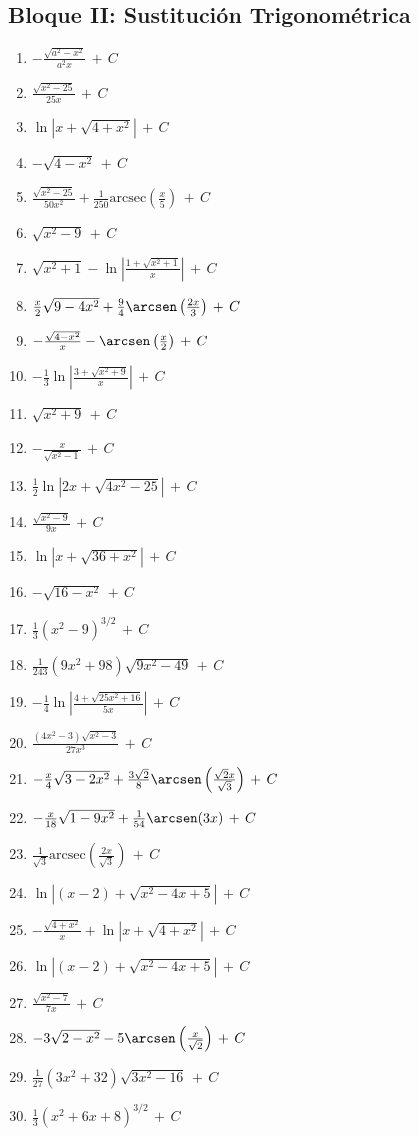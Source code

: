 \documentclass[12pt, letterpaper]{article}
\newcommand{\CC}{\,+\,C}
\begin{document}
\subsection*{Bloque II: Sustitución Trigonométrica}
\begin{enumerate}[leftmargin=*, label=\textbf{\arabic*.}, resume]
  \item $-\frac{\sqrt{a^2-x^2}}{a^2 x} \CC$
  \item $\frac{\sqrt{x^2-25}}{25x} \CC$
  \item $\ln|x + \sqrt{4+x^2}| \CC$
  \item $-\sqrt{4-x^2} \CC$
  \item $\frac{\sqrt{x^2-25}}{50 x^2} + \frac{1}{250}\text{arcsec}\left(\frac{x}{5}\right) \CC$
  \item $\sqrt{x^2-9} \CC$
  \item $\sqrt{x^2+1} - \ln\left|\frac{1+\sqrt{x^2+1}}{x}\right| \CC$
  \item $\frac{x}{2}\sqrt{9-4x^2} + \frac{9}{4}\arcsen\left(\frac{2x}{3}\right) \CC$
  \item $-\frac{\sqrt{4-x^2}}{x} - \arcsen\left(\frac{x}{2}\right) \CC$
  \item $-\frac{1}{3}\ln\left|\frac{3+\sqrt{x^2+9}}{x}\right| \CC$
  \item $\sqrt{x^2+9} \CC$
  \item $-\frac{x}{\sqrt{x^2-1}} \CC$
  \item $\frac{1}{2}\ln|2x + \sqrt{4x^2-25}| \CC$
  \item $\frac{\sqrt{x^2-9}}{9x} \CC$
  \item $\ln|x + \sqrt{36+x^2}| \CC$
  \item $-\sqrt{16-x^2} \CC$
  \item $\frac{1}{3}(x^2-9)^{3/2} \CC$
  \item $\frac{1}{243}(9x^2+98)\sqrt{9x^2-49} \CC$
  \item $-\frac{1}{4}\ln\left|\frac{4+\sqrt{25x^2+16}}{5x}\right| \CC$
  \item $\frac{(4x^2-3)\sqrt{x^2-3}}{27 x^3} \CC$
  \item $-\frac{x}{4}\sqrt{3-2x^2} + \frac{3\sqrt{2}}{8}\arcsen\left(\frac{\sqrt{2}x}{\sqrt{3}}\right) \CC$
  \item $-\frac{x}{18}\sqrt{1-9x^2} + \frac{1}{54}\arcsen(3x) \CC$
  \item $\frac{1}{\sqrt{3}}\text{arcsec}\left(\frac{2x}{\sqrt{3}}\right) \CC$
  \item $\ln|(x-2) + \sqrt{x^2-4x+5}| \CC$
  \item $-\frac{\sqrt{4+x^2}}{x} + \ln|x + \sqrt{4+x^2}| \CC$
  \item $\ln|(x-2) + \sqrt{x^2-4x+5}| \CC$
  \item $\frac{\sqrt{x^2-7}}{7x} \CC$
  \item $-3\sqrt{2-x^2} - 5\arcsen\left(\frac{x}{\sqrt{2}}\right) \CC$
  \item $\frac{1}{27}(3x^2+32)\sqrt{3x^2-16} \CC$
  \item $\frac{1}{3}(x^2+6x+8)^{3/2} \CC$
\end{enumerate}
\end{document}
